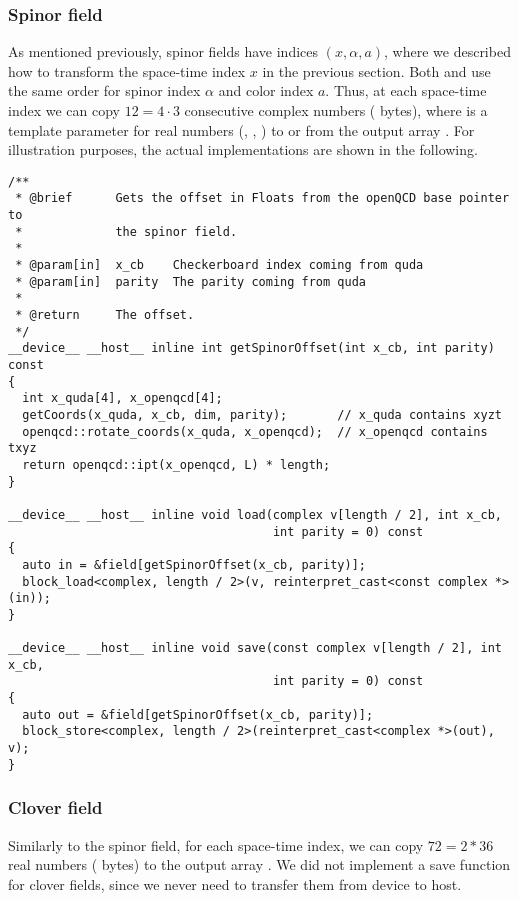 \subsubsection{Spinor field}

As mentioned previously, spinor fields have indices $(x,\alpha,a)$, where we described how to transform the space-time index $x$ in the previous section.
Both \quda and \openqxd use the same order for spinor index $\alpha$ and color index $a$.
Thus, at each space-time index we can copy $12=4 \cdot 3$ consecutive complex numbers (\ie {} bytes), where  is a template parameter for real numbers (, , ) to or from the output array .
For illustration purposes, the actual implementations are shown in the following.
\begin{verbatim}
/**
 * @brief      Gets the offset in Floats from the openQCD base pointer to
 *             the spinor field.
 *
 * @param[in]  x_cb    Checkerboard index coming from quda
 * @param[in]  parity  The parity coming from quda
 *
 * @return     The offset.
 */
__device__ __host__ inline int getSpinorOffset(int x_cb, int parity) const
{
  int x_quda[4], x_openqcd[4];
  getCoords(x_quda, x_cb, dim, parity);       // x_quda contains xyzt
  openqcd::rotate_coords(x_quda, x_openqcd);  // x_openqcd contains txyz
  return openqcd::ipt(x_openqcd, L) * length;
}

__device__ __host__ inline void load(complex v[length / 2], int x_cb,
                                     int parity = 0) const
{
  auto in = &field[getSpinorOffset(x_cb, parity)];
  block_load<complex, length / 2>(v, reinterpret_cast<const complex *>(in));
}

__device__ __host__ inline void save(const complex v[length / 2], int x_cb,
                                     int parity = 0) const
{
  auto out = &field[getSpinorOffset(x_cb, parity)];
  block_store<complex, length / 2>(reinterpret_cast<complex *>(out), v);
}
\end{verbatim}

\subsubsection{Clover field}

Similarly to the spinor field, for each space-time index, we can copy $72 = 2*36$ real numbers (\ie {} bytes) to the output array .
We did not implement a save function for clover fields, since we never need to transfer them from device to host.

